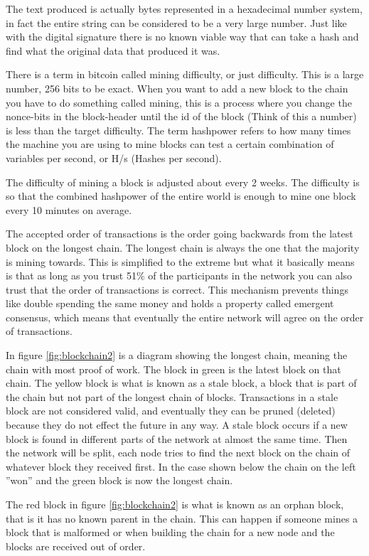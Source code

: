 The text produced is actually bytes represented in a hexadecimal number system,
in fact the entire string can be considered to be a very large number. Just like
with the digital signature there is no known viable way that can take a hash and
find what the original data that produced it was.

There is a term in bitcoin called mining difficulty, or just difficulty. This
is a large number, 256 bits to be exact. When you want to add a new block to
the chain you have to do something called mining, this is a process where you
change the nonce-bits in the block-header until the id of the block (Think
of this a number) is less than the target difficulty. The term hashpower refers
to how many times the machine you are using to mine blocks can test a certain
combination of variables per second, or H/s (Hashes per second).

The difficulty of mining a block is adjusted about every 2 weeks. The difficulty
is so that the combined hashpower of the entire world is enough to mine one
block every 10 minutes on average.\cite{antonopoulos_2017}

The accepted order of transactions is the order going backwards from the latest
block on the longest chain. The longest chain is always the one that the majority
is mining towards. This is simplified to the extreme but what it basically
means is that as long as you trust 51\% of the participants in the network you
can also trust that the order of transactions is correct. This mechanism
prevents things like double spending the same money and holds a property called
emergent consensus, which means that eventually the entire network will agree
on the order of transactions.

In figure \ref{fig:blockchain2} is a diagram showing the longest chain, meaning
the chain with most proof of work. The block in green is the latest block on
that chain. The yellow block is what is known as a stale block, a block that is
part of the chain but not part of the longest chain of blocks. Transactions in
a stale block are not considered valid, and eventually they can be pruned
(deleted) because they do not effect the future in any way. A stale block occurs
if a new block is found in different parts of the network at almost the same
time. Then the network will be split, each node tries to find the next block on
the chain of whatever block they received first. In the case shown below the
chain on the left ''won'' and the green block is now the longest chain.

The red block in figure \ref{fig:blockchain2} is what is known as an orphan
block, that is it has no known parent in the chain. This can happen if someone
mines a block that is malformed or when building the chain for a new node and
the blocks are received out of order.

